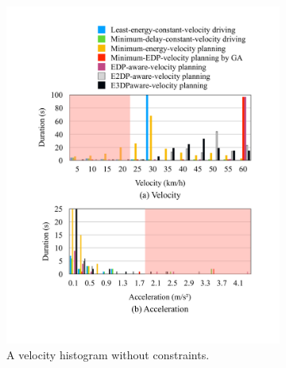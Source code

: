 \documentclass[onecolumn]{IEEEconf}
\begin{document}
\begin{description}
\begin{figure}[h!]
\begin{subfigure}{0.45\textwidth}
	\includegraphics[width=\hsize]{Figures/Histogram_noconst_vel.pdf}
	\caption{A velocity histogram without constraints.}
	\label{fig:histogram_noconst_vel}
	\end{subfigure}
	\begin{subfigure}{0.45\textwidth}

\end{subfigure}
\end{figure}
\end{description}
\end{document}
